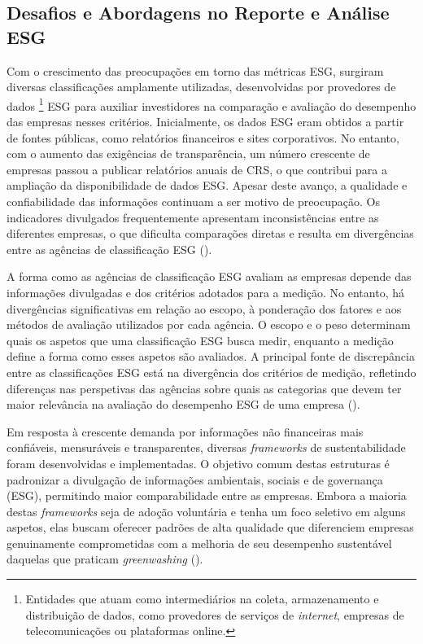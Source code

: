 
\subsection{Desafios e Abordagens no Reporte e Análise ESG}
\label{subsec: MARAESG}

Com o crescimento das preocupações em torno das métricas \gls{ESG}, surgiram diversas classificações amplamente utilizadas, desenvolvidas por provedores de dados \footnote{Entidades que atuam como intermediários na coleta, armazenamento e distribuição de dados, como provedores de serviços de \textit{internet}, empresas de telecomunicações ou plataformas online.} ESG para auxiliar investidores na comparação e avaliação do desempenho das empresas nesses critérios. Inicialmente, os dados ESG eram obtidos a partir de fontes públicas, como relatórios financeiros e sites corporativos. No entanto, com o aumento das exigências de transparência, um número crescente de empresas passou a publicar relatórios anuais de \gls{CRS}, o que contribui para a ampliação da disponibilidade de dados ESG. Apesar deste avanço, a qualidade e confiabilidade das informações continuam a ser motivo de preocupação. Os indicadores divulgados frequentemente apresentam inconsistências entre as diferentes empresas, o que dificulta comparações diretas e resulta em divergências entre as agências de classificação ESG (\cite{Rau2024}).

A forma como as agências de classificação ESG avaliam as empresas depende das informações divulgadas e dos critérios adotados para a medição. No entanto, há divergências significativas em relação ao escopo, à ponderação dos fatores e aos métodos de avaliação utilizados por cada agência. O escopo e o peso determinam quais os aspetos que uma classificação ESG busca medir, enquanto a medição define a forma como esses aspetos são avaliados. A principal fonte de discrepância entre as classificações ESG está na divergência dos critérios de medição, refletindo diferenças nas perspetivas das agências sobre quais as categorias que devem ter maior relevância na avaliação do desempenho ESG de uma empresa (\cite{Berg2022}).

Em resposta à crescente demanda por informações não financeiras mais confiáveis, mensuráveis e transparentes, diversas \textit{frameworks} de sustentabilidade foram desenvolvidas e implementadas. O objetivo comum destas estruturas é padronizar a divulgação de informações ambientais, sociais e de governança (ESG), permitindo maior comparabilidade entre as empresas. Embora a maioria destas \textit{frameworks} seja de adoção voluntária e tenha um foco seletivo em alguns aspetos, elas buscam oferecer padrões de alta qualidade que diferenciem empresas genuinamente comprometidas com a melhoria de seu desempenho sustentável daquelas que praticam \textit{greenwashing} (\cite{Cruz2023}).

